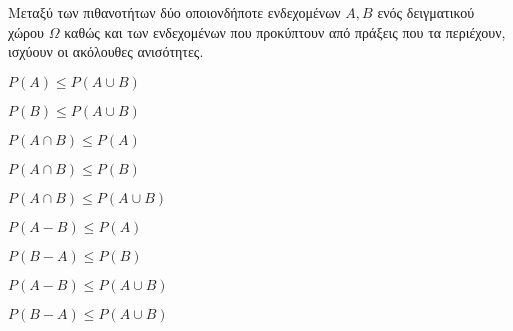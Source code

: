 Μεταξύ των πιθανοτήτων δύο οποιονδήποτε ενδεχομένων $ A,B $ ενός δειγματικού χώρου $ \varOmega $ καθώς και των ενδεχομένων που προκύπτουν από πράξεις που τα περιέχουν, ισχύουν οι ακόλουθες ανισότητες.
\begin{multicols}{3}
\begin{rlist}
\item $ P(A)\leq P(A\cup B) $
\item $ P(B)\leq P(A\cup B) $
\item $ P(A\cap B)\leq P(A) $
\item $ P(A\cap B)\leq P(B) $
\item $ P(A\cap B)\leq P(A\cup B) $
\item $ P(A-B)\leq P(A) $
\item $ P(B-A)\leq P(B) $
\item $ P(A-B)\leq P(A\cup B) $
\item $ P(B-A)\leq P(A\cup B) $
\end{rlist}
\end{multicols}
